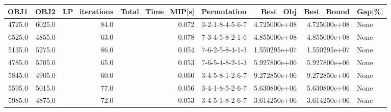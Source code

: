 \begin{tabular}{rrrrlrrl}
\toprule
   OBJ1 &    OBJ2 &  LP\_iterations &  Total\_Time\_MIP[s] &      Permutation &      Best\_Obj &    Best\_Bound & Gap[\%] \\
\midrule
 4725.0 &  6025.0 &           84.0 &              0.072 &  3-2-1-8-4-5-6-7 &  4.725000e+08 &  4.725000e+08 &   None \\
 6525.0 &  4855.0 &           63.0 &              0.078 &  7-3-4-5-8-2-1-6 &  4.855000e+08 &  4.855000e+08 &   None \\
 5135.0 &  5275.0 &           86.0 &              0.054 &  7-6-2-5-8-4-1-3 &  1.550295e+07 &  1.550295e+07 &   None \\
 4785.0 &  5705.0 &           65.0 &              0.053 &  7-6-5-4-8-2-1-3 &  5.927800e+06 &  5.927800e+06 &   None \\
 5845.0 &  4905.0 &           60.0 &              0.060 &  3-4-5-8-1-2-6-7 &  9.272850e+06 &  9.272850e+06 &   None \\
 5595.0 &  5015.0 &           77.0 &              0.056 &  3-4-1-8-5-2-6-7 &  5.630800e+06 &  5.630800e+06 &   None \\
 5985.0 &  4875.0 &           72.0 &              0.053 &  3-4-5-1-8-2-6-7 &  3.614250e+06 &  3.614250e+06 &   None \\
\bottomrule
\end{tabular}
